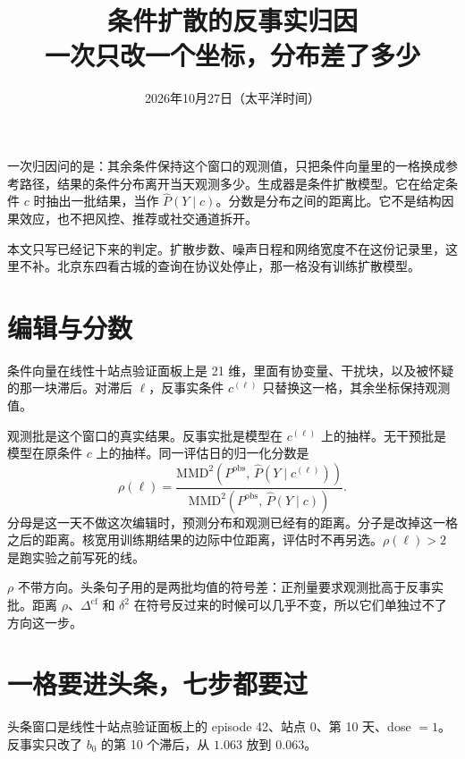 \documentclass[11pt]{article}
\title{条件扩散的反事实归因\\[0.4em]
\large 一次只改一个坐标，分布差了多少}
\author{}
\date{2026年10月27日（太平洋时间）}
\begin{document}
\maketitle

一次归因问的是：其余条件保持这个窗口的观测值，只把条件向量里的一格换成参考路径，结果的条件分布离开当天观测多少。生成器是条件扩散模型。它在给定条件 \(c\) 时抽出一批结果，当作 \(\widehat P(Y\mid c)\)。分数是分布之间的距离比。它不是结构因果效应，也不把风控、推荐或社交通道拆开。

本文只写已经记下来的判定。扩散步数、噪声日程和网络宽度不在这份记录里，这里不补。北京东四看古城的查询在协议处停止，那一格没有训练扩散模型。

\section{编辑与分数}

条件向量在线性十站点验证面板上是 21 维，里面有协变量、干扰块，以及被怀疑的那一块滞后。对滞后 \(\ell\)，反事实条件 \(c^{(\ell)}\) 只替换这一格，其余坐标保持观测值。

观测批是这个窗口的真实结果。反事实批是模型在 \(c^{(\ell)}\) 上的抽样。无干预批是模型在原条件 \(c\) 上的抽样。同一评估日的归一化分数是
\begin{equation}
\label{eq:rho}
\rho(\ell)
=
\frac{\mathrm{MMD}^{2}\!\left(P^{\mathrm{obs}},\,\widehat P(Y\mid c^{(\ell)})\right)}
{\mathrm{MMD}^{2}\!\left(P^{\mathrm{obs}},\,\widehat P(Y\mid c)\right)}.
\end{equation}
分母是这一天不做这次编辑时，预测分布和观测已经有的距离。分子是改掉这一格之后的距离。核宽用训练期结果的边际中位距离，评估时不再另选。\(\rho(\ell)>2\) 是跑实验之前写死的线。

\(\rho\) 不带方向。头条句子用的是两批均值的符号差：正剂量要求观测批高于反事实批。距离 \(\rho\)、\(\Delta^{\mathrm{cf}}\) 和 \(\delta^{2}\) 在符号反过来的时候可以几乎不变，所以它们单独过不了方向这一步。

\section{一格要进头条，七步都要过}

头条窗口是线性十站点验证面板上的 episode 42、站点 0、第 10 天、dose \(=1\)。反事实只改了 \(b_0\) 的第 10 个滞后，从 \(1.063\) 放到 \(0.063\)。
\end{document}
